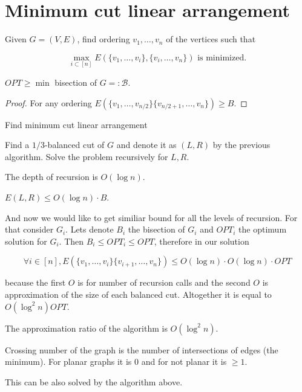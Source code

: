 \section{Minimum cut linear arrangement}

Given $G = (V,E)$, find ordering $v_1, \dots, v_n$ of the vertices such that

$$
\max_{i \subset [n]} E(\{v_{1}, \dots, v_{i}\}, \{v_{i}, \dots, v_{n}\}) \text{ is minimized.}
$$

\begin{observ}
	$OPT \geq \min$ bisection of $G = : \mathcal{B}$.
\end{observ}

\begin{proof}
	For any ordering $E(\{v_{1}, \dots, v_{n/2}\} \{v_{n/2 +1}, \dots, v_{n}\}) \geq B$.
\end{proof}

\begin{algorithm}
	\caption{Find minimum cut linear arrangement}
	\begin{algorithmic}[1]
		\State Find a $1/3$-balanced cut of $G$ and denote it as $(L,R)$ by the previous algorithm.
		\State Solve the problem recursively for $L,R$.
	\end{algorithmic}
\end{algorithm}

\begin{observ}
	The depth of recursion is $O(\log n)$.
\end{observ}

\begin{observ}
	$E(L,R) \leq O (\log n) \cdot B$.
\end{observ}

And now we would like to get similiar bound for all the levels of recursion. For that consider $G_{i}$. Lets denote $B_{i}$ the bisection of $G_{i}$ and $OPT_{i}$ the optimum solution for $G_{i}$. Then $B_{i} \leq OPT_{i} \leq OPT$, therefore in our solution

$$
\forall i \in [n], E(\{v_{1}, \dots, v_{i}\} \{v_{i+1}, \dots, v_{n}\}) \leq O(\log n) \cdot O(\log n) \cdot OPT
$$

because the first $O$ is for number of recursion calls and the second $O$ is approximation of the size of each balanced cut. Altogether it is equal to $O(\log^2 n) OPT$.

\begin{thm}
	The approximation ratio of the algorithm is $O(\log^2 n)$.
\end{thm}

\begin{defn}
	Crossing number of the graph is the number of intersections of edges (the minimum). For planar graphs it is 0 and for not planar it is $\geq 1$.
\end{defn}

This can be also solved by the algorithm above.
